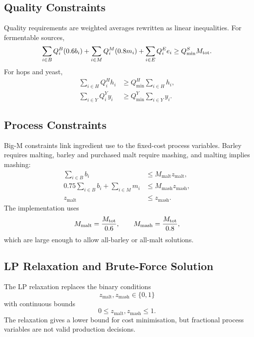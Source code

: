 \subsection{Quality Constraints}
\label{sec:quality-constraints}
Quality requirements are weighted averages rewritten as linear inequalities. For fermentable sources,
\begin{equation}
  \sum_{i \in B} Q^B_i(0.6b_i)
  +\sum_{i \in M} Q^M_i(0.8m_i)
  +\sum_{i \in E} Q^E_i e_i
  \geq Q^S_{\min}M_{\mathrm{tot}}.
  \label{eq:quality-source}
\end{equation}
For hops and yeast,
\begin{align}
  \sum_{i \in H} Q^H_i h_i
  &\geq Q^H_{\min}\sum_{i \in H}h_i, \label{eq:quality-hop}\\
  \sum_{i \in Y} Q^Y_i y_i
  &\geq Q^Y_{\min}\sum_{i \in Y}y_i. \label{eq:quality-yeast}
\end{align}

\subsection{Process Constraints}
\label{sec:process-constraints}
Big-M constraints link ingredient use to the fixed-cost process variables. Barley requires malting, barley and purchased malt require mashing, and malting implies mashing:
\begin{align}
  \sum_{i \in B} b_i
  &\leq M_{\mathrm{malt}} z_{\mathrm{malt}}, \label{eq:link-malt}\\
  0.75\sum_{i \in B} b_i+\sum_{i \in M}m_i
  &\leq M_{\mathrm{mash}} z_{\mathrm{mash}}, \label{eq:link-mash}\\
  z_{\mathrm{malt}} &\leq z_{\mathrm{mash}}. \label{eq:link-logical}
\end{align}
The implementation uses
\begin{equation}
  M_{\mathrm{malt}}=\frac{M_{\mathrm{tot}}}{0.6},\qquad
  M_{\mathrm{mash}}=\frac{M_{\mathrm{tot}}}{0.8},
  \label{eq:bigm-values}
\end{equation}
which are large enough to allow all-barley or all-malt solutions.

\subsection{LP Relaxation and Brute-Force Solution}
\label{sec:relaxation-bruteforce}
The LP relaxation replaces the binary conditions
\begin{equation}
  z_{\mathrm{malt}}, z_{\mathrm{mash}} \in \{0,1\}
\end{equation}
with continuous bounds
\begin{equation}
  0 \leq z_{\mathrm{malt}}, z_{\mathrm{mash}} \leq 1.
  \label{eq:relaxation}
\end{equation}
The relaxation gives a lower bound for cost minimisation, but fractional process variables are not valid production decisions.

